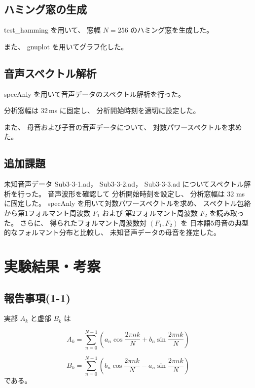 \documentclass{jsarticle}
\begin{document}
\subsection{ハミング窓の生成}

test\_hamming を用いて、
窓幅 $N=256$ のハミング窓を生成した。

また、
gnuplot を用いてグラフ化した。

\subsection{音声スペクトル解析}

specAnly を用いて音声データのスペクトル解析を行った。

分析窓幅は 32\,ms に固定し、
分析開始時刻を適切に設定した。

また、
母音および子音の音声データについて、
対数パワースペクトルを求めた。

\subsection{追加課題}
未知音声データ
Sub3-3-1.ad，
Sub3-3-2.ad，
Sub3-3-3.ad
についてスペクトル解析を行った。
音声波形を確認して
分析開始時刻を設定し、
分析窓幅は 32 ms に固定した。
specAnly を用いて対数パワースペクトルを求め、
スペクトル包絡から第1フォルマント周波数 $F_1$ および
第2フォルマント周波数 $F_2$
を読み取った。
さらに、
得られたフォルマント周波数対 $(F_1,F_2)$ を
日本語5母音の典型的なフォルマント分布と比較し、
未知音声データの母音を推定した。
\section{実験結果・考察}

\subsection{報告事項(1-1)}
実部 $A_k$ と虚部 $B_k$ は

\begin{equation}
A_k
=
\sum_{n=0}^{N-1}
\left(
a_n\cos\frac{2\pi nk}{N}
+
b_n\sin\frac{2\pi nk}{N}
\right)
\end{equation}

\begin{equation}
B_k
=
\sum_{n=0}^{N-1}
\left(
b_n\cos\frac{2\pi nk}{N}
-
a_n\sin\frac{2\pi nk}{N}
\right)
\end{equation}
である。
\end{document}
